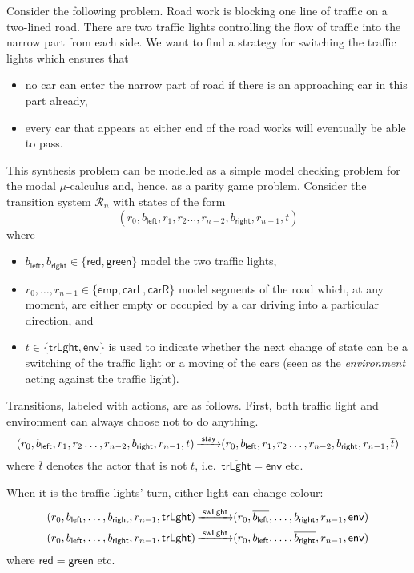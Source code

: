 Consider the following problem. Road work is blocking one line of traffic on a two-lined road. There are two traffic lights
controlling the flow of traffic into the narrow part from each side. We want to find a strategy for switching the traffic lights
which ensures that 
\begin{itemize}
\item no car can enter the narrow part of road if there is an approaching car in this part already,
\item every car that appears at either end of the road works will eventually be able to pass.
\end{itemize}
This synthesis problem can be modelled as a simple model checking problem for the modal $\mu$-calculus and, hence, as a parity 
game problem. Consider the transition system $\mathcal{R}_n$ with states of the form 
\begin{displaymath}
(r_0,b_{\mathsf{left}},r_1,r_2\ldots,r_{n-2},b_{\mathsf{right}},r_{n-1},t) 
\end{displaymath}
where 
\begin{itemize}
\item $b_{\mathsf{left}},b_{\mathsf{right}} \in \{ \mathsf{red},\mathsf{green} \}$ model the two traffic lights,
\item $r_0,\ldots,r_{n-1} \in \{\mathsf{emp},\mathsf{carL},\mathsf{carR}\}$ model segments of the road which, at any moment,
      are either empty or occupied by a car driving into a particular direction, and   
\item $t \in \{\mathsf{trLght},\mathsf{env}\}$ is used to indicate whether the next change of state can be 
      a switching of the traffic light or a moving of the cars (seen as the \emph{environment} acting against the traffic light). 
\end{itemize} 
Transitions, labeled with actions, are as follows. First, both traffic light and environment can always choose not to do anything.
\begin{displaymath}
\Transition{(r_0,b_{\mathsf{left}},r_1,r_2\ldots,r_{n-2},b_{\mathsf{right}},r_{n-1},t)}{\mathsf{stay}}{(r_0,b_{\mathsf{left}},r_1,r_2\ldots,r_{n-2},b_{\mathsf{right}},r_{n-1},\overline{t})} 
\end{displaymath}
where $\overline{t}$ denotes the actor that is not $t$, i.e.\ $\overline{\mathsf{trLght}} = \mathsf{env}$ etc.

When it is the traffic lights' turn, either light can change colour:
\begin{align*}
&\Transition{(r_0,b_{\mathsf{left}},\ldots,b_{\mathsf{right}},r_{n-1},\mathsf{trLght})}{\mathsf{swLght}}{(r_0,\overline{b_{\mathsf{left}}},\ldots,b_{\mathsf{right}},r_{n-1},\mathsf{env})} \\
&\Transition{(r_0,b_{\mathsf{left}},\ldots,b_{\mathsf{right}},r_{n-1},\mathsf{trLght})}{\mathsf{swLght}}{(r_0,b_{\mathsf{left}},\ldots,\overline{b_{\mathsf{right}}},r_{n-1},\mathsf{env})} 
\end{align*}
where $\overline{\mathsf{red}} = \mathsf{green}$ etc.

